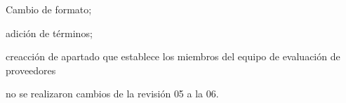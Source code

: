 \begin{changelog}[title=Registro de cambios,simple, sectioncmd=\subsection*,label=changelog-\thesection-\MayorVer.\MenorVer]

    \begin{version}[v=2.1, date=2023--01, author=Pablo E. Alanis]
        \item Cambio de formato;
        \item adición de términos;
        \item creacción de apartado que establece los miembros del equipo de evaluación de proveedores
    \end{version}

    \begin{version}[v=1.4, date=2022-02, author=Alonso M.]
        \item no se realizaron cambios de la revisión 05 a la 06.
    \end{version}
\end{changelog}